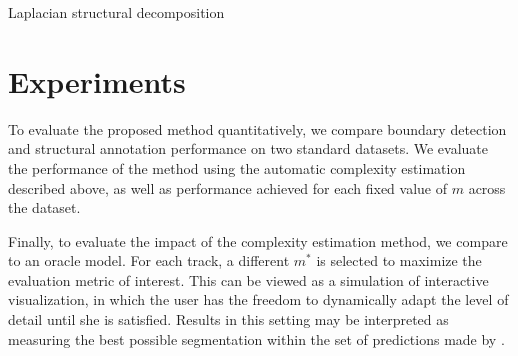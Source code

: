 \documentclass{article}
\begin{document}
\begin{algorithm}[t]
\caption{Laplacian structural decomposition\label{lsd}}
\begin{algorithmic}[1]
 
 
\EndFor{}
\EndFunction{}
\end{algorithmic}
\end{algorithm}


\section{Experiments}
To evaluate the proposed method quantitatively, we compare boundary detection and
structural annotation performance on two standard datasets.  We evaluate the
performance of the method using the automatic complexity estimation described above,
as well as performance achieved for each fixed value of $m$ across the dataset.

Finally, to evaluate the impact of the complexity estimation method, we compare to an
oracle model. For each track, a different $m^*$ is selected to maximize the
evaluation metric of interest.  This can be viewed as a simulation of interactive
visualization, in which the user has the freedom to dynamically adapt the level of
detail until she is satisfied.  Results in this setting may be interpreted as
measuring the best possible segmentation within the set of predictions made by
.
\end{document}
